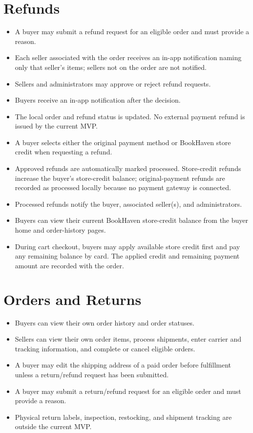 \documentclass[11pt]{scrreprt}
\begin{document}
\section{Refunds}
\begin{itemize}
\item A buyer may submit a refund request for an eligible order and must provide
a reason.
\item Each seller associated with the order receives an in-app notification
naming only that seller's items; sellers not on the order are not notified.
\item Sellers and administrators may approve or reject refund requests.
\item Buyers receive an in-app notification after the decision.
\item The local order and refund status is updated. No external payment refund
is issued by the current MVP.
\item A buyer selects either the original payment method or BookHaven store
credit when requesting a refund.
\item Approved refunds are automatically marked processed. Store-credit
refunds increase the buyer's store-credit balance; original-payment refunds
are recorded as processed locally because no payment gateway is connected.
\item Processed refunds notify the buyer, associated seller(s), and
administrators.
\item Buyers can view their current BookHaven store-credit balance from the
buyer home and order-history pages.
\item During cart checkout, buyers may apply available store credit first and
pay any remaining balance by card. The applied credit and remaining payment
amount are recorded with the order.
\end{itemize}

\section{Orders and Returns}
\begin{itemize}
\item Buyers can view their own order history and order statuses.
\item Sellers can view their own order items, process shipments, enter carrier
and tracking information, and complete or cancel eligible orders.
\item A buyer may edit the shipping address of a paid order before fulfillment
unless a return/refund request has been submitted.
\item A buyer may submit a return/refund request for an eligible order and must
provide a reason.
\item Physical return labels, inspection, restocking, and shipment tracking
are outside the current MVP.
\end{itemize}
\end{document}
